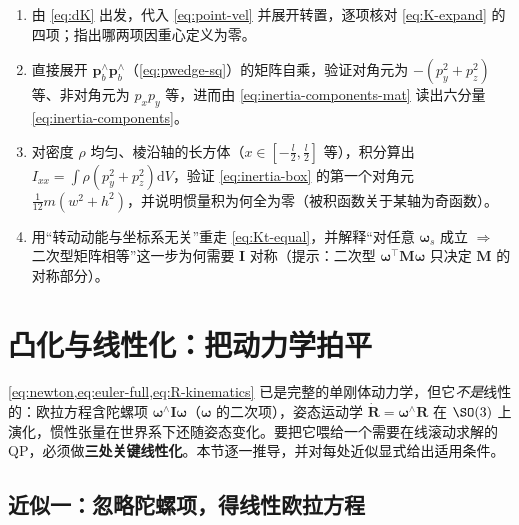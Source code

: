 \begin{practice}
\begin{enumerate}
  \item 由 \cref{eq:dK} 出发，代入 \cref{eq:point-vel} 并展开转置，逐项核对 \cref{eq:K-expand} 的四项；指出哪两项因重心定义为零。
  \item 直接展开 $\boldsymbol{p}_b^\wedge\boldsymbol{p}_b^\wedge$（\cref{eq:pwedge-sq}）的矩阵自乘，验证对角元为 $-(p_y^2+p_z^2)$ 等、非对角元为 $p_xp_y$ 等，进而由 \cref{eq:inertia-components-mat} 读出六分量 \cref{eq:inertia-components}。
  \item 对密度 $\rho$ 均匀、棱沿轴的长方体（$x\in[-\tfrac l2,\tfrac l2]$ 等），积分算出 $I_{xx}=\int\rho(p_y^2+p_z^2)\mathrm{d}V$，验证 \cref{eq:inertia-box} 的第一个对角元 $\tfrac1{12}m(w^2+h^2)$，并说明惯量积为何全为零（被积函数关于某轴为奇函数）。
  \item 用“转动动能与坐标系无关”重走 \cref{eq:Kt-equal}，并解释“对任意 $\boldsymbol{\omega}_s$ 成立 $\Rightarrow$ 二次型矩阵相等”这一步为何需要 $\mathbf{I}$ 对称（提示：二次型 $\boldsymbol{\omega}^\top\mathbf{M}\boldsymbol{\omega}$ 只决定 $\mathbf{M}$ 的对称部分）。
\end{enumerate}
\end{practice}

\section{凸化与线性化：把动力学拍平}
\label{sec:convexify}

\cref{eq:newton,eq:euler-full,eq:R-kinematics} 已是完整的单刚体动力学，但它\emph{不是}线性的：欧拉方程含陀螺项 $\boldsymbol{\omega}^\wedge\mathbf{I}\boldsymbol{\omega}$（$\boldsymbol{\omega}$ 的二次项），姿态运动学 $\dot{\mathbf{R}}=\boldsymbol{\omega}^\wedge\mathbf{R}$ 在 $\SO(3)$ 上演化，惯性张量在世界系下还随姿态变化。要把它喂给一个需要在线滚动求解的 QP，必须做\textbf{三处关键线性化}。本节逐一推导，并对每处近似显式给出适用条件。

\subsection{近似一：忽略陀螺项，得线性欧拉方程}
\label{subsec:drop-gyro}


